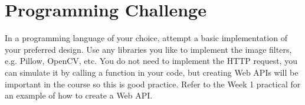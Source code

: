 \documentclass{csse4400}
\begin{document}
\section{Programming Challenge}
In a programming language of your choice,
attempt a basic implementation of your preferred design.
Use any libraries you like to implement the image filters, e.g. Pillow, OpenCV, etc.
You do not need to implement the HTTP request, you can simulate it by calling a function in your code,
but creating Web APIs will be important in the course so this is good practice.
Refer to the Week 1 practical for an example of how to create a Web API.
\end{document}
